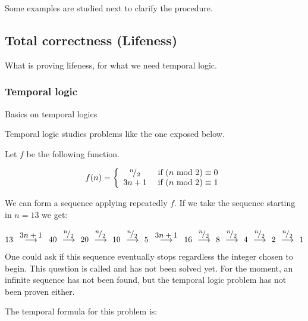 Some examples are studied next to clarify the procedure.

\begin{example}

\end{example}



\subsection{Total correctness (Lifeness)}

What is proving lifeness, for what we need temporal logic.

\subsubsection{Temporal logic}

Basics on temporal logics

Temporal logic studies problems like the one exposed below.

\begin{example}
\label{Collatz:conjecture}

Let $f$ be the following function.

\[
f(n) = \left\{
	\begin{array}{cc}
		{}^{n}\!/_{2} & \text{ if } (n\text{ mod } 2) \equiv 0\\
		3n+1 & \text{ if } (n\text{ mod } 2) \equiv 1
	\end{array}
\right.
\]

We can form a sequence applying repeatedly $f$. If we take the sequence starting in $n=13$ we get:

\[ 
	13 \overset{\displaystyle\;\; 3n+1\;\;}{\longrightarrow}
	40 \overset{\displaystyle\;\;{}^{n}\!/_{2}\;\;}{\longrightarrow}
	20 \overset{\displaystyle\;\;{}^{n}\!/_{2}\;\;}{\longrightarrow}
	10 \overset{\displaystyle\;\;{}^{n}\!/_{2}\;\;}{\longrightarrow}
	5 \overset{\displaystyle\;\; 3n+1\;\;}{\longrightarrow}
	16 \overset{\displaystyle\;\;{}^{n}\!/_{2}\;\;}{\longrightarrow}
	8 \overset{\displaystyle\;\;{}^{n}\!/_{2}\;\;}{\longrightarrow}
	4 \overset{\displaystyle\;\;{}^{n}\!/_{2}\;\;}{\longrightarrow}
	2 \overset{\displaystyle\;\;{}^{n}\!/_{2}\;\;}{\longrightarrow}
	1
\]

One could ask if this sequence eventually stops regardless the integer chosen to begin. This question is called  and has not been solved yet. 
For the moment, an infinite sequence has not been found, but the temporal logic problem has not been proven either.

The temporal formula for this problem is:



\end{example}


